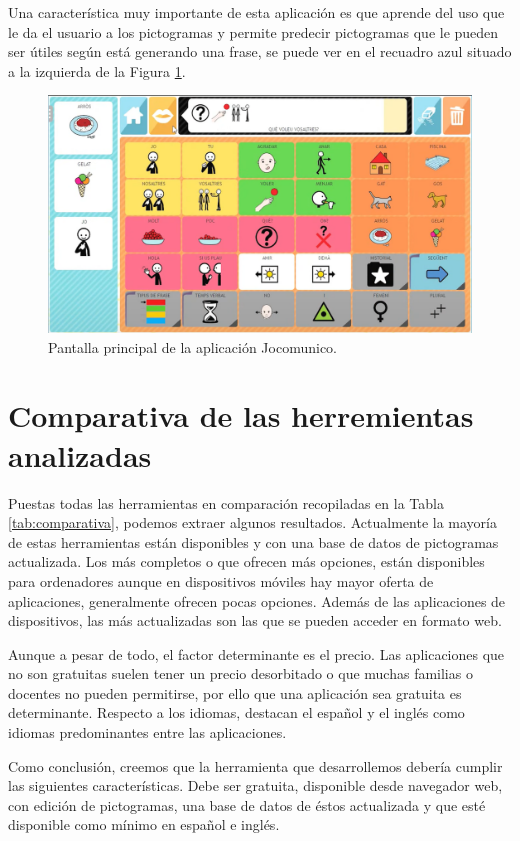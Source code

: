 Una característica muy importante de esta aplicación es que aprende del uso que le da el usuario a los pictogramas y permite predecir pictogramas que le pueden ser útiles según está generando una frase, se puede ver en el recuadro azul situado a la izquierda de la Figura \ref{fig:jocomunico}.

\begin{figure}[h!]
	\centering
	\includegraphics[width=0.7\linewidth]{Imagenes/Bitmap/jocomunico}
	\caption{Pantalla principal de la aplicación Jocomunico.}
	\label{fig:jocomunico}
\end{figure}


\section*{Comparativa de las herremientas analizadas}


Puestas todas las herramientas en comparación recopiladas en la Tabla \ref{tab:comparativa}, podemos extraer algunos resultados. Actualmente la mayoría de estas herramientas están disponibles y con una base de datos de pictogramas actualizada. Los más completos o que ofrecen más opciones, están disponibles para ordenadores aunque en dispositivos móviles hay mayor oferta  de aplicaciones, generalmente ofrecen pocas opciones. Además de las aplicaciones de dispositivos, las más actualizadas son las que se pueden acceder en formato web.

Aunque a pesar de todo, el factor determinante es el precio. Las aplicaciones que no son gratuitas suelen tener un precio desorbitado o que muchas familias o docentes no pueden permitirse, por ello que una aplicación sea gratuita es determinante. Respecto a los idiomas, destacan el español y el inglés como idiomas predominantes entre las aplicaciones. 

Como conclusión, creemos que la herramienta que desarrollemos debería cumplir las siguientes características. Debe ser gratuita, disponible desde navegador web, con edición de pictogramas, una base de datos de éstos actualizada y que esté disponible como mínimo en español e inglés. 


